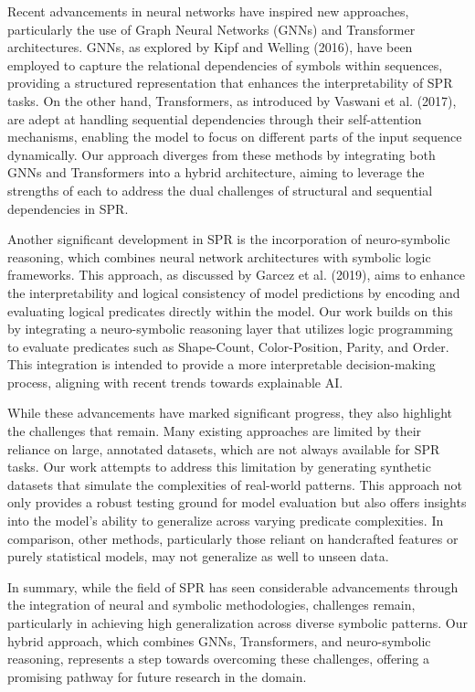\documentclass{article}
\begin{document}
Recent advancements in neural networks have inspired new approaches, particularly the use of Graph Neural Networks (GNNs) and Transformer architectures. GNNs, as explored by Kipf and Welling (2016), have been employed to capture the relational dependencies of symbols within sequences, providing a structured representation that enhances the interpretability of SPR tasks. On the other hand, Transformers, as introduced by Vaswani et al. (2017), are adept at handling sequential dependencies through their self-attention mechanisms, enabling the model to focus on different parts of the input sequence dynamically. Our approach diverges from these methods by integrating both GNNs and Transformers into a hybrid architecture, aiming to leverage the strengths of each to address the dual challenges of structural and sequential dependencies in SPR.

Another significant development in SPR is the incorporation of neuro-symbolic reasoning, which combines neural network architectures with symbolic logic frameworks. This approach, as discussed by Garcez et al. (2019), aims to enhance the interpretability and logical consistency of model predictions by encoding and evaluating logical predicates directly within the model. Our work builds on this by integrating a neuro-symbolic reasoning layer that utilizes logic programming to evaluate predicates such as Shape-Count, Color-Position, Parity, and Order. This integration is intended to provide a more interpretable decision-making process, aligning with recent trends towards explainable AI.

While these advancements have marked significant progress, they also highlight the challenges that remain. Many existing approaches are limited by their reliance on large, annotated datasets, which are not always available for SPR tasks. Our work attempts to address this limitation by generating synthetic datasets that simulate the complexities of real-world patterns. This approach not only provides a robust testing ground for model evaluation but also offers insights into the model’s ability to generalize across varying predicate complexities. In comparison, other methods, particularly those reliant on handcrafted features or purely statistical models, may not generalize as well to unseen data.

In summary, while the field of SPR has seen considerable advancements through the integration of neural and symbolic methodologies, challenges remain, particularly in achieving high generalization across diverse symbolic patterns. Our hybrid approach, which combines GNNs, Transformers, and neuro-symbolic reasoning, represents a step towards overcoming these challenges, offering a promising pathway for future research in the domain.
\end{document}
